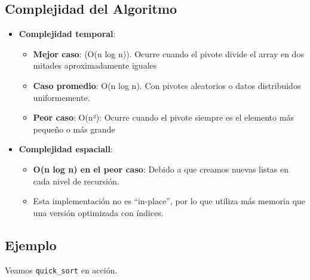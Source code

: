 \documentclass[
  spanish,
  letterpaper,
  DIV=11,
  numbers=noendperiod]{scrreprt}
\providecommand{\tightlist}{%
  \setlength{\itemsep}{0pt}\setlength{\parskip}{0pt}}
\begin{document}
\subsection{Complejidad del
Algoritmo}\label{complejidad-del-algoritmo-5}

\begin{itemize}
\tightlist
\item
  \textbf{Complejidad temporal}:

  \begin{itemize}
  \tightlist
  \item
    \textbf{Mejor caso}: (O(n log n)). Ocurre cuando el pivote divide el
    array en dos mitades aproximadamente iguales
  \item
    \textbf{Caso promedio}: O(n log n). Con pivotes aleatorios o datos
    distribuidos uniformemente.
  \item
    \textbf{Peor caso}: O(n²): Ocurre cuando el pivote siempre es el
    elemento más pequeño o más grande
  \end{itemize}
\item
  \textbf{Complejidad espaciall}:

  \begin{itemize}
  \tightlist
  \item
    \textbf{O(n log n) en el peor caso}: Debido a que creamos nuevas
    listas en cada nivel de recursión.
  \item
    Esta implementación no es ``in-place'', por lo que utiliza más
    memoria que una versión optimizada con índices.
  \end{itemize}
\end{itemize}

\subsection{Ejemplo}\label{ejemplo-7}

Veamos \texttt{quick\_sort} en acción.
\end{document}

